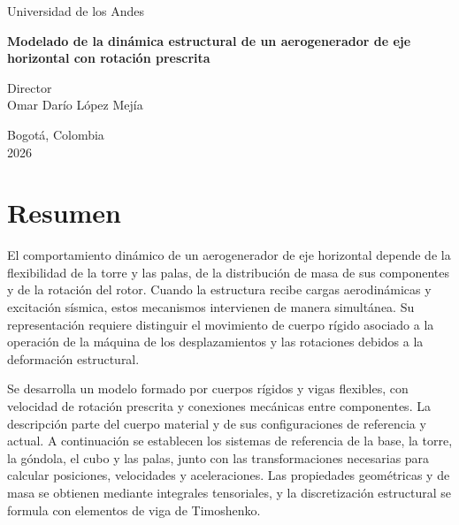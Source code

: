 \documentclass[11pt,a4paper,oneside]{report}
\begin{document}
\hypersetup{pageanchor=false}
\begin{titlepage}
\centering\vspace*{10mm}
{\Large Universidad de los Andes\par}
\vspace{3mm}{Facultad de Ingeniería\\Departamento de Ingeniería Mecánica\par}
\vspace{22mm}
{\LARGE\bfseries Modelado de la dinámica estructural de un aerogenerador de eje horizontal con rotación prescrita\par}
\vspace{18mm}{\Large Nicolás Andrés Useche Castillo\par}
\vspace{20mm}
{Director\\Omar Darío López Mejía\par}
\vspace{7mm}{Codirector\\Sergio Preidikman\par}
\vfill
{Bogotá, Colombia\\2026\par}
\end{titlepage}
\hypersetup{pageanchor=true}
\chapter*{Resumen}
El comportamiento dinámico de un aerogenerador de eje horizontal depende de la flexibilidad de la torre y las palas, de la distribución de masa de sus componentes y de la rotación del rotor. Cuando la estructura recibe cargas aerodinámicas y excitación sísmica, estos mecanismos intervienen de manera simultánea. Su representación requiere distinguir el movimiento de cuerpo rígido asociado a la operación de la máquina de los desplazamientos y las rotaciones debidos a la deformación estructural.

Se desarrolla un modelo formado por cuerpos rígidos y vigas flexibles, con velocidad de rotación prescrita y conexiones mecánicas entre componentes. La descripción parte del cuerpo material y de sus configuraciones de referencia y actual. A continuación se establecen los sistemas de referencia de la base, la torre, la góndola, el cubo y las palas, junto con las transformaciones necesarias para calcular posiciones, velocidades y aceleraciones. Las propiedades geométricas y de masa se obtienen mediante integrales tensoriales, y la discretización estructural se formula con elementos de viga de Timoshenko.
\end{document}
